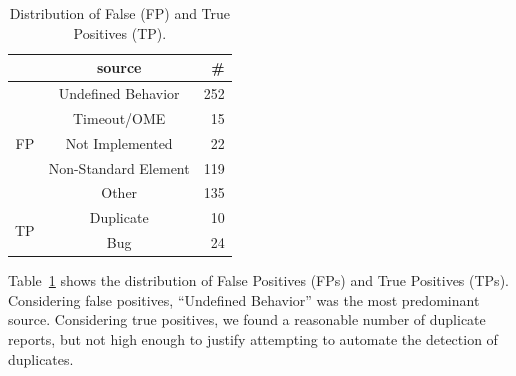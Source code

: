\documentclass[sigconf,review, anonymous]{acmart}
\begin{document}
\begin{table}
  \vspace{-3ex}
  \small
  \centering
  \caption{\label{fig:falsepositives}\label{fig:truepositives}\label{fig:piecharts-transplantation}Distribution
    of False (FP) and True Positives (TP).}
  \setlength{\tabcolsep}{3pt}      
  \renewcommand*{\arraystretch}{0.9}
  \begin{tabular}{ccr}
    \toprule
    & source &  \#\\
    \midrule
    \multirow{5}{*}{FP} & Undefined Behavior & 252 \\
    & Timeout/OME & 15 \\
    & Not Implemented & 22 \\
    & Non-Standard Element & 119 \\
    & Other & 135 \\
    \midrule
    \multirow{2}{*}{TP} & Duplicate & 10 \\
    & Bug & 24 \\
    \bottomrule
  \end{tabular}
\end{table}
Table~\ref{fig:piecharts-transplantation} shows the distribution of
False Positives (FPs) and True Positives (TPs). Considering false
positives, ``Undefined Behavior'' was the most predominant
source. Considering true positives, we found a reasonable number of
duplicate reports, but not high enough to justify attempting to
automate the detection of duplicates.





\end{document}
